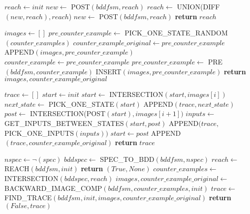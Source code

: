\documentclass{article}
\begin{document}
\begin{algorithmic}

    \State $reach\leftarrow init$
    \State $new\leftarrow$ POST$(bddfsm, reach)$
        \State $reach\leftarrow$ UNION(DIFF$(new, reach),reach$)
        \State $new\leftarrow$ POST$(bddfsm, reach)$
    \EndWhile
    \State \textbf{return }$reach$
\EndFunction

\medskip

    \State $images \leftarrow []$
    \State $pre\_counter\_example \leftarrow$ PICK\_ONE\_STATE\_RANDOM$(counter\_examples)$
    \State $counter\_example\_original \leftarrow pre\_counter\_example$
    \State APPEND$(images, pre\_counter\_example)$
        \State $counter\_example \leftarrow pre\_counter\_example$
        \State $pre\_counter\_example \leftarrow$ PRE$(bddfsm, counter\_example)$
        \State INSERT$(images, pre\_counter\_example)$
    \EndWhile
    \State \textbf{return }$images, counter\_example\_original$
\EndFunction

\medskip

    \State $trace \leftarrow []$
    \State $start \leftarrow init$
     
        \State $start \leftarrow$ INTERSECTION$(start, images[i])$
        \State $next\_state \leftarrow$ PICK\_ONE\_STATE$(start)$
        \State APPEND$(trace, next\_state)$
        \State $post \leftarrow$ INTERSECTION(POST$(start), images[i+1])$
        \State $inputs \leftarrow$ GET\_INPUTS\_BETWEEN\_STATES$(start, post)$
        \State APPEND$(trace,$ PICK\_ONE\_INPUTS$(inputs))$
        \State $start \leftarrow post$
    \EndFor
    \State APPEND$(trace, counter\_example\_original)$
    \State \textbf{return }$trace$
\EndFunction

\medskip

    \State $nspec \leftarrow \neg(spec)$
    \State $bddspec \leftarrow$ SPEC\_TO\_BDD$(bddfsm, nspec)$
    \State $reach \leftarrow$ REACH$(bddfsm, init)$
        \State \textbf{return }$(True, None)$
    \Else
        \State $counter\_examples \leftarrow$ INTERSECTION$(bddspec, reach)$
        \State $images,counter\_example\_original \leftarrow$ \newline
                \hspace*{5em}BACKWARD\_IMAGE\_COMP$(bddfsm, counter\_examples, init)$
        \State $trace \leftarrow$ \newline
                \hspace*{5em}FIND\_TRACE$(bddfsm, init, images, counter\_example\_original)$
        \State \textbf{return }$(False, trace)$
    \EndIf
\EndFunction
\end{algorithmic}
\end{document}

